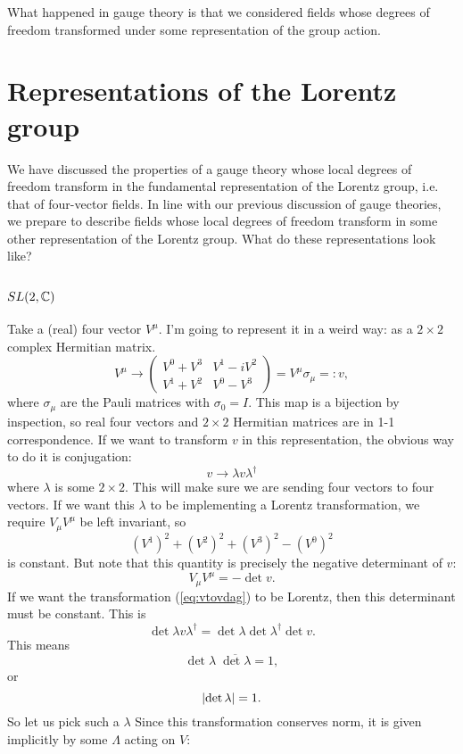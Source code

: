 \documentclass[main.tex]{subfiles}
\begin{document}
What happened in gauge theory is that we considered fields whose degrees of freedom transformed under some representation of the group action.
\newpage
\section{Representations of the Lorentz group}
We have discussed the properties of a gauge theory whose local degrees of freedom transform in the fundamental representation of the Lorentz group, i.e. that of four-vector fields. In line with our previous discussion of gauge theories, we prepare to describe fields whose local degrees of freedom transform in some other representation of the Lorentz group. What do these representations look like?

\subsection{$SL(2,\mathbb{C})$}
Take a (real) four vector $V^\mu$. I'm going to represent it in a weird way: as a $2 \times 2$ complex Hermitian matrix.
\begin{equation}
V^\mu \to \begin{pmatrix}
V^0 + V^3 & V^1 - iV^2 \\
V^1 + V^2 & V^0 - V^3
\end{pmatrix} = V^\mu \sigma_\mu =: v,
\end{equation}
where $\sigma_\mu$ are the Pauli matrices with $\sigma_0 = I$. This map is a bijection by inspection, so real four vectors and $2\times 2$ Hermitian matrices are in 1-1 correspondence. If we want to transform $v$ in this representation, the obvious way to do it is conjugation:
\begin{equation} \label{eq:vtovdag}
v \to \lambda v \lambda^\dagger
\end{equation}
where $\lambda$ is some $2\times 2$. This will make sure we are sending four vectors to four vectors. If we want this $\lambda$ to be implementing a Lorentz transformation, we require $V_\mu V^\mu$ be left invariant, so 
\[
(V^1)^2 + (V^2)^2 + (V^3)^2 - (V^0)^2 
\]
is constant. But note that this quantity is precisely the negative determinant of $v$:
\[
V_\mu V^\mu = - \det v.
\]
If we want the transformation (\ref{eq:vtovdag}) to be Lorentz, then this determinant must be constant. This is
\[
\det{\lambda v \lambda^{\dagger}} = \det {\lambda} \det{\lambda^\dagger} \det v.
\]
This means
\[
\det \lambda \; \overline{\det \lambda} = 1,
\]
or
\[
\abs{\det \lambda} = 1.
\]
So let us pick such a $\lambda$ Since this transformation conserves norm, it is given implicitly by some $\Lambda$ acting on $V$:
\end{document}
